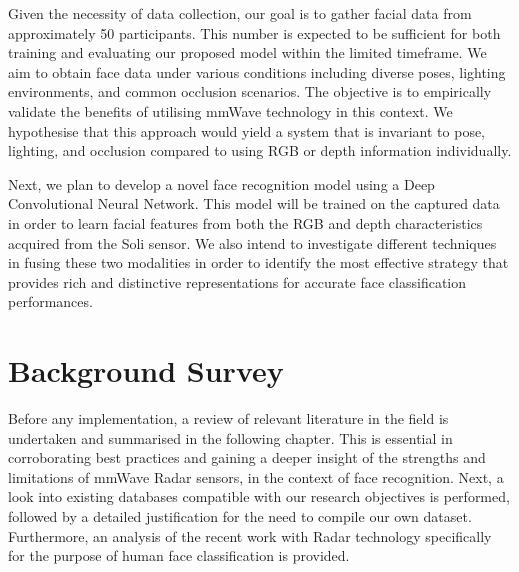 \documentclass{interim}
\begin{document}
Given the necessity of data collection, our goal is to gather facial data from approximately 50 participants. This number is expected to be sufficient for both training and evaluating our proposed model within the limited timeframe. We aim to obtain face data under various conditions including diverse poses, lighting environments, and common occlusion scenarios. The objective is to empirically validate the benefits of utilising mmWave technology in this context. We hypothesise that this approach would yield a system that is invariant to pose, lighting, and occlusion compared to using RGB or depth information individually.

Next, we plan to develop a novel face recognition model using a Deep Convolutional Neural Network. This model will be trained on the captured data in order to learn facial features from both the RGB and depth characteristics acquired from the Soli sensor. We also intend to investigate different techniques in fusing these two modalities in order to identify the most effective strategy that provides rich and distinctive representations for accurate face classification performances. 




\section{Background Survey}
Before any implementation, a review of relevant literature in the field is undertaken and summarised in the following chapter. This is essential in corroborating best practices and gaining a deeper insight of the strengths and limitations of mmWave Radar sensors, in the context of face recognition. Next, a look into existing databases compatible with our research objectives is performed, followed by a detailed justification for the need to compile our own dataset. Furthermore, an analysis of the recent work with Radar technology specifically for the purpose of human face classification is provided.
\end{document}
